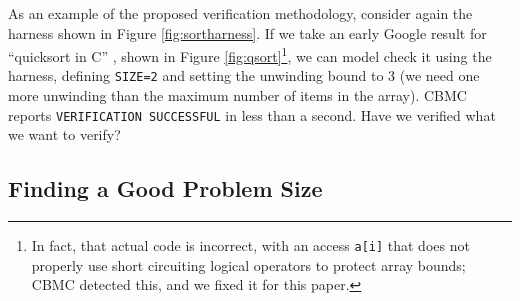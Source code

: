 \documentclass{svjour3}
\begin{document}
As an example of the proposed verification methodology, consider again
the harness shown in Figure \ref{fig:sortharness}.  If we take an
early Google result for ``quicksort in C'' \cite{quicksortcode},
shown in Figure \ref{fig:qsort}\footnote{In fact, that actual code is
  incorrect, with an access {\tt a[i]} that does not properly use
  short circuiting logical operators to protect array bounds; CBMC
  detected this, and we fixed it for this paper.}, we can model check
it using the harness, defining {\tt SIZE=2} and setting the unwinding
bound to 3 (we need one more unwinding than the maximum
number of items in the array).  CBMC reports {\tt VERIFICATION
  SUCCESSFUL} in less than a second.  Have we verified
what we want to verify?

\subsection{Finding a Good Problem Size}
\label{sec:unwind}
\end{document}
